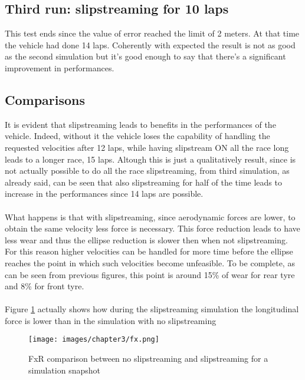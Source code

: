 \documentclass{report}
\let\Oldsubsection\subsection
\renewcommand{\subsection}{\FloatBarrier\Oldsubsection}
\begin{document}
\subsection{Third run: slipstreaming for 10 laps}
This test ends since the value of error reached the limit of 2 meters. At that time the vehicle had done 14 laps. Coherently with expected the result is not as good as the second simulation but it's good enough to say that there's a significant improvement in performances.

\subsection{Comparisons}
It is evident that slipstreaming leads to benefits in the performances of the vehicle. Indeed, without it the vehicle loses the capability of handling the requested velocities after 12 laps, while having slipstream ON all the race long leads to a longer race, 15 laps. Altough this is just a qualitatively result, since is not actually possible to do all the race slipstreaming, from third simulation, as already said, can be seen that also slipstreaming for half of the time leads to increase in the performances since 14 laps are possible.
\\\\What happens is that with slipstreaming, since aerodynamic forces are lower, to obtain the same velocity less force is necessary. This force reduction leads to have less wear and thus the ellipse reduction is slower then when not slipstreaming. For this reason higher velocities can be handled for more time before the ellipse reaches the point in which such velocities become unfeasible. To be complete, as can be seen from previous figures, this point is around 15\% of wear for rear tyre and 8\% for front tyre. 
\\\\Figure \ref{fig:res_Fx_comparison} actually shows how during the slipstreaming simulation the longitudinal force is lower than in the simulation with no slipstreaming

\begin{figure}[h!]
    \centering
    \texttt{[image: images/chapter3/fx.png]}
    \caption{FxR comparison between no slipstreaming and slipstreaming for a simulation snapshot}
    \label{fig:res_Fx_comparison}
\end{figure}
\end{document}
